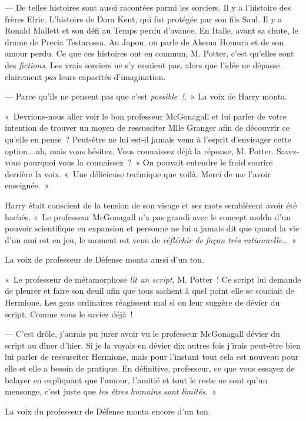 --- De telles histoires sont aussi racontées parmi les sorciers.
Il y a l'histoire des frères Elric.
L'histoire de Dora Kent, qui fut protégée par son fils Saul.
Il y a Ronald Mallett et son défi au Temps perdu d'avance.
En Italie, avant sa chute, le drame de Precia Testarossa.
Au Japon, on parle de Akema Homura et de son amour perdu.
Ce que ces histoires ont en commun, M. Potter, c'est qu'elles sont des \emph{fictions}.
Les vrais sorciers ne s'y essaient pas, alors que l'idée ne dépasse clairement \emph{pas} leurs capacités d'imagination.

--- Parce qu'ils ne pensent pas que c'est \emph{possible~!}.~»
La voix de Harry monta.

«~Devrions-nous aller voir le bon professeur McGonagall et lui parler de votre intention de trouver un moyen de ressusciter Mlle Granger afin de découvrir ce qu'elle en pense~?
Peut-être ne lui est-il jamais venu à l'esprit d'envisager cette option… ah, mais vous hésitez.
Vous connaissez déjà la réponse, M. Potter.
Savez-vous pourquoi vous la connaissez~?~»
On pouvait entendre le froid sourire derrière la voix.
«~Une délicieuse technique que voilà.
Merci de me l'avoir enseignée.~»

Harry était conscient de la tension de son visage et ses mots semblèrent avoir été hachés.
«~Le professeur McGonagall n'a pas grandi avec le concept moldu d'un pouvoir scientifique en expansion et personne ne lui a jamais dit que quand la vie d'un ami est en jeu, le moment est venu de \emph{réfléchir de façon très rationnelle…}~»

La voix de professeur de Défense monta aussi d'un ton.

«~Le professeur de métamorphose \emph{lit un script}, M. Potter~!
Ce script lui demande de pleurer et faire son deuil afin que tous sachent à quel point elle se souciait de Hermione.
Les gens ordinaires réagissent mal si on leur suggère de dévier du script.
Comme vous le saviez déjà~!

--- C'est drôle, j'aurais pu jurer avoir vu le professeur McGonagall dévier du script au dîner d'hier.
Si je la voyais en dévier dix autres fois j'irais peut-être bien lui parler de ressusciter Hermione, mais pour l'instant tout cela est nouveau pour elle et elle a besoin de pratique.
En définitive, professeur, ce que vous essayez de balayer en expliquant que l'amour, l'amitié et tout le reste ne sont qu'un mensonge, c'est juste que \emph{les êtres humains sont limités.}~»

La voix du professeur de Défense monta encore d'un ton.

